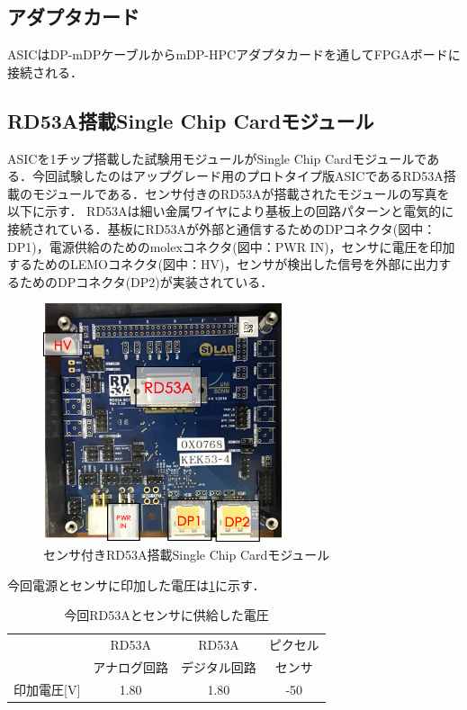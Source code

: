 \subsection*{アダプタカード}
ASICはDP-mDPケーブルからmDP-HPCアダプタカードを通してFPGAボードに接続される．

\subsection*{RD53A搭載Single Chip Cardモジュール}
ASICを1チップ搭載した試験用モジュールがSingle Chip Cardモジュールである．今回試験したのはアップグレード用のプロトタイプ版ASICであるRD53A搭載のモジュールである．センサ付きのRD53Aが搭載されたモジュールの写真を以下に示す．
RD53Aは細い金属ワイヤにより基板上の回路パターンと電気的に接続されている．基板にRD53Aが外部と通信するためのDPコネクタ(図中：DP1)，電源供給のためのmolexコネクタ(図中：PWR IN)，センサに電圧を印加するためのLEMOコネクタ(図中：HV)，センサが検出した信号を外部に出力するためのDPコネクタ(DP2)が実装されている．
\begin{figure}[h]
  \centering
  \includegraphics[width=7cm]{./figure/rd53a.png}
  \caption{センサ付きRD53A搭載Single Chip Cardモジュール}
  \label{fig:scurve}
\end{figure}

今回電源とセンサに印加した電圧は\ref{tab:voltage}に示す．

\begin{table}[h]
  \centering
  \caption{今回RD53Aとセンサに供給した電圧}
  \begin{tabular} {|l|cc|c|} \hline
     & RD53A & RD53A & ピクセル \\ 
     & アナログ回路 & デジタル回路 & センサ \\ \hline
    印加電圧[$\mathrm{V}$] & 1.80 & 1.80 & -50 \\ \hline
  \end{tabular}
  \label{tab:voltage}
\end{table}


